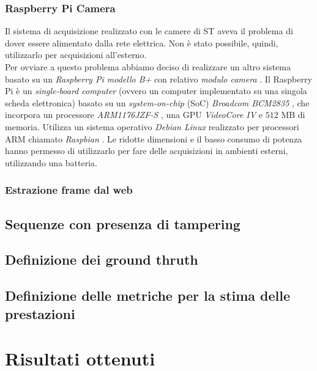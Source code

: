 \subsubsection{Raspberry Pi Camera}
Il sistema di acquisizione realizzato con le camere di ST aveva il problema di dover essere alimentato dalla rete elettrica.
Non \`e stato possibile, quindi, utilizzarlo per acquisizioni all'esterno.\\
Per ovviare a questo problema abbiamo deciso di realizzare un altro sistema basato su un \textit{Raspberry Pi modello B+} \cite{raspberry} con relativo \textit{modulo camera} \cite{raspberryCamera}.
Il Raspberry Pi \`e un \textit{single-board computer} (ovvero un computer implementato su una singola scheda elettronica) basato su un \textit{system-on-chip} (SoC) \textit{Broadcom BCM2835} \cite{broadcom}, che incorpora un processore \textit{ARM1176JZF-S} \cite{arm}, una GPU \textit{VideoCore IV} \cite{gpu} e $512$ MB di memoria.
Utilizza un sistema operativo \textit{Debian Linux} realizzato per processori ARM chiamato \textit{Raspbian} \cite{raspbian}.
Le ridotte dimensioni e il basso consumo di potenza hanno permesso di utilizzarlo per fare delle acquisizioni in ambienti esterni, utilizzando una batteria. 
\subsubsection{Estrazione frame dal web}

\subsection{Sequenze con presenza di tampering}
\subsection{Definizione dei ground thruth}
\subsection{Definizione delle metriche per la stima delle prestazioni}
\section{Risultati ottenuti}